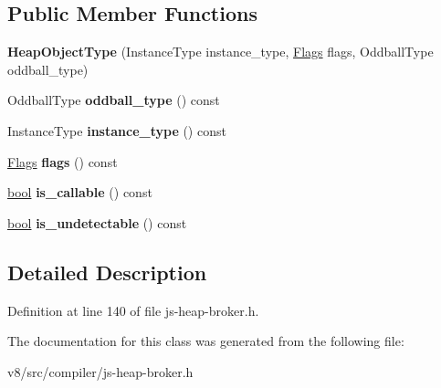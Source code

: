 \subsection*{Public Member Functions}
\begin{DoxyCompactItemize}
\item 
\mbox{\label{classv8_1_1internal_1_1compiler_1_1HeapObjectType_ade7c5b1c64c9b31d5195d0593ef9b476}} 
{\bfseries Heap\+Object\+Type} (Instance\+Type instance\+\_\+type, \mbox{\hyperlink{classv8_1_1base_1_1Flags}{Flags}} flags, Oddball\+Type oddball\+\_\+type)
\item 
\mbox{\label{classv8_1_1internal_1_1compiler_1_1HeapObjectType_a5f50dd81b359668dfdeab130af7494f5}} 
Oddball\+Type {\bfseries oddball\+\_\+type} () const
\item 
\mbox{\label{classv8_1_1internal_1_1compiler_1_1HeapObjectType_a79496d5f06a37ce9e75670f2334ea28b}} 
Instance\+Type {\bfseries instance\+\_\+type} () const
\item 
\mbox{\label{classv8_1_1internal_1_1compiler_1_1HeapObjectType_aa59b475b14dda12a64bf4932e81a6768}} 
\mbox{\hyperlink{classv8_1_1base_1_1Flags}{Flags}} {\bfseries flags} () const
\item 
\mbox{\label{classv8_1_1internal_1_1compiler_1_1HeapObjectType_a33bd62bc808ffeb1d485c56ac2cf4d56}} 
\mbox{\hyperlink{classbool}{bool}} {\bfseries is\+\_\+callable} () const
\item 
\mbox{\label{classv8_1_1internal_1_1compiler_1_1HeapObjectType_a48ba9858b161c7007a7efcc5437b695e}} 
\mbox{\hyperlink{classbool}{bool}} {\bfseries is\+\_\+undetectable} () const
\end{DoxyCompactItemize}


\subsection{Detailed Description}


Definition at line 140 of file js-\/heap-\/broker.\+h.



The documentation for this class was generated from the following file\+:\begin{DoxyCompactItemize}
\item 
v8/src/compiler/js-\/heap-\/broker.\+h\end{DoxyCompactItemize}
